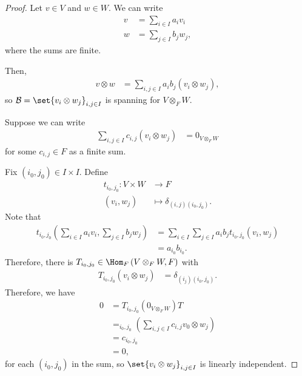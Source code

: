 \documentclass[10pt]{mypackage}
\begin{document}
  \begin{proof}
    Let $v\in V$ and $w\in W$. We can write
    \begin{align*}
      v &= \sum_{i\in I}a_iv_i\\
      w &= \sum_{j\in I}b_jw_j,
    \end{align*}
    where the sums are finite.\newline

    Then,
    \begin{align*}
      v\otimes w &= \sum_{i,j\in I} a_ib_j\left(v_i\otimes w_j\right),
    \end{align*}
    so $\mathcal{B} = \set{v_i\otimes w_j}_{i,j\in I}$ is spanning for $V\otimes_{F} W$.\newline

    Suppose we can write
    \begin{align*}
      \sum_{i,j\in I}c_{i,j}\left(v_i\otimes w_j\right) &= 0_{V\otimes_{F} W}
    \end{align*}
    for some $c_{i,j}\in F$ as a finite sum.\newline

    Fix $\left(i_0,j_0\right)\in I\times I$. Define
    \begin{align*}
      t_{i_0,j_0}: V\times W &\rightarrow F\\
      \left(v_i,w_j\right) &\mapsto \delta_{(i,j)\left(i_0,j_0\right)}.
    \end{align*}
    Note that
    \begin{align*}
      t_{i_0,j_0}\left(\sum_{i\in I}a_iv_i,\sum_{j\in I}b_jw_j\right) &= \sum_{i\in I}\sum_{j\in I}a_ib_jt_{i_0,j_0}\left(v_{i},w_j\right)\\
                                                                      &= a_{i_0}b_{i_0}.
    \end{align*}
    Therefore, there is $T_{i_0,j_0}\in \Hom_{F}\left(V\otimes_{F}W,F\right)$ with
    \begin{align*}
      T_{i_0,j_0}\left(v_{i}\otimes w_j\right) &= \delta_{\left(i_j\right)\left(i_{0},j_0\right)}.
    \end{align*}
    Therefore, we have
    \begin{align*}
      0 &= T_{i_0,j_0}\left(0_{V\otimes_{F}W}\right)T\\
        &= _{i_0,j_0}\left(\sum_{i,j\in I}c_{i,j}v_0\otimes w_j\right)\\
        &= c_{i_0,j_0}\\
                                                                   &= 0,
    \end{align*}
    for each $\left(i_0,j_0\right)$ in the sum, so $\set{v_i\otimes w_j}_{i,j\in I}$ is linearly independent.
  \end{proof}
\end{document}
